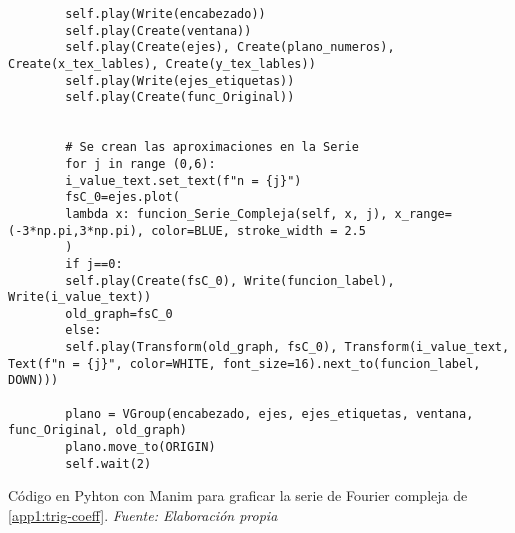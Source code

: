 \begin{longlisting}
\begin{verbatim}
		self.play(Write(encabezado))
		self.play(Create(ventana))
		self.play(Create(ejes), Create(plano_numeros), Create(x_tex_lables), Create(y_tex_lables))
		self.play(Write(ejes_etiquetas))
		self.play(Create(func_Original))
		
		
		# Se crean las aproximaciones en la Serie
		for j in range (0,6):
		i_value_text.set_text(f"n = {j}")
		fsC_0=ejes.plot(
		lambda x: funcion_Serie_Compleja(self, x, j), x_range=(-3*np.pi,3*np.pi), color=BLUE, stroke_width = 2.5
		)
		if j==0:
		self.play(Create(fsC_0), Write(funcion_label), Write(i_value_text))
		old_graph=fsC_0
		else:
		self.play(Transform(old_graph, fsC_0), Transform(i_value_text, Text(f"n = {j}", color=WHITE, font_size=16).next_to(funcion_label, DOWN)))
		
		plano = VGroup(encabezado, ejes, ejes_etiquetas, ventana, func_Original, old_graph)
		plano.move_to(ORIGIN)
		self.wait(2)
	\end{verbatim}
	\caption[Código en Pyhton con Manim para graficar la serie de Fourier compleja de \ref{app1:trig-coeff}.] {Código en Pyhton con Manim para graficar la serie de Fourier compleja de \ref{app1:trig-coeff}. \textit{Fuente: Elaboración propia}} 
\end{longlisting}

